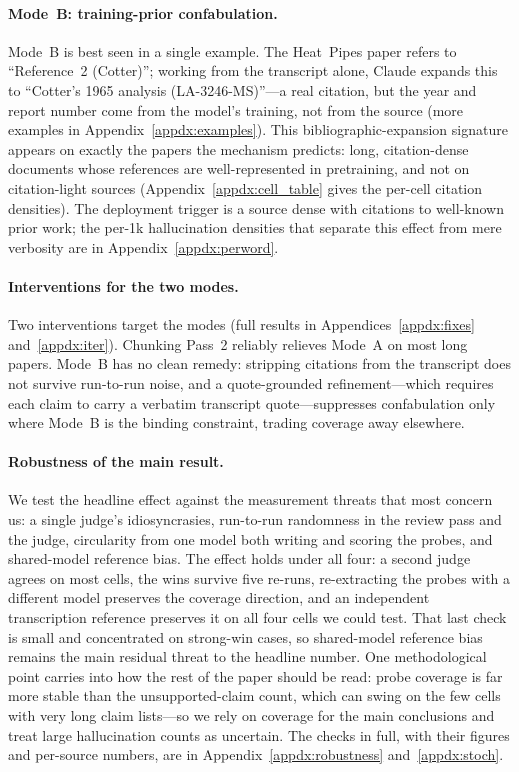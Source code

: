 \documentclass[11pt]{article}
\begin{document}
\paragraph{Mode~B: training-prior confabulation.}
Mode~B is best seen in a single example. The Heat~Pipes paper refers to ``Reference~2 (Cotter)''; working from the transcript alone, Claude expands this to ``Cotter's 1965 analysis (LA-3246-MS)''---a real citation, but the year and report number come from the model's training, not from the source (more examples in Appendix~\ref{appdx:examples}). This bibliographic-expansion signature appears on exactly the papers the mechanism predicts: long, citation-dense documents whose references are well-represented in pretraining, and not on citation-light sources (Appendix~\ref{appdx:cell_table} gives the per-cell citation densities). The deployment trigger is a source dense with citations to well-known prior work; the per-1k hallucination densities that separate this effect from mere verbosity are in Appendix~\ref{appdx:perword}.

\paragraph{Interventions for the two modes.}
Two interventions target the modes (full results in Appendices~\ref{appdx:fixes} and~\ref{appdx:iter}). Chunking Pass~2 reliably relieves Mode~A on most long papers. Mode~B has no clean remedy: stripping citations from the transcript does not survive run-to-run noise, and a quote-grounded refinement---which requires each claim to carry a verbatim transcript quote---suppresses confabulation only where Mode~B is the binding constraint, trading coverage away elsewhere.

\paragraph{Robustness of the main result.}
\label{sec:robust}
We test the headline effect against the measurement threats that most concern us: a single judge's idiosyncrasies, run-to-run randomness in the review pass and the judge, circularity from one model both writing and scoring the probes, and shared-model reference bias. The effect holds under all four: a second judge agrees on most cells, the wins survive five re-runs, re-extracting the probes with a different model preserves the coverage direction, and an independent transcription reference preserves it on all four cells we could test. That last check is small and concentrated on strong-win cases, so shared-model reference bias remains the main residual threat to the headline number. One methodological point carries into how the rest of the paper should be read: probe coverage is far more stable than the unsupported-claim count, which can swing on the few cells with very long claim lists---so we rely on coverage for the main conclusions and treat large hallucination counts as uncertain. The checks in full, with their figures and per-source numbers, are in Appendix~\ref{appdx:robustness} and~\ref{appdx:stoch}.
\end{document}
